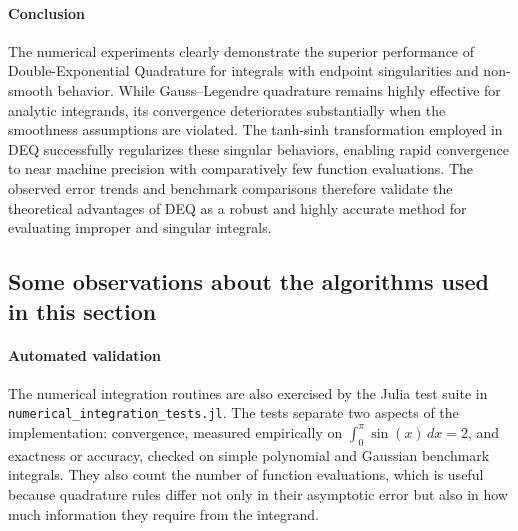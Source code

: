 \begin{solution}
	\paragraph{Conclusion}
	The numerical experiments clearly demonstrate the superior performance of
	Double-Exponential Quadrature for integrals with endpoint singularities and
	non-smooth behavior. While Gauss--Legendre quadrature remains highly effective
	for analytic integrands, its convergence deteriorates substantially when the
	smoothness assumptions are violated. The tanh-sinh transformation employed in
	DEQ successfully regularizes these singular behaviors, enabling rapid
	convergence to near machine precision with comparatively few function
	evaluations. The observed error trends and benchmark comparisons therefore
	validate the theoretical advantages of DEQ as a robust and highly accurate
	method for evaluating improper and singular integrals.

\end{solution}

\subsection{Some observations about the algorithms used in this section}

\paragraph{Automated validation}
The numerical integration routines are also exercised by the Julia test suite in
\texttt{numerical\_integration\_tests.jl}. The tests separate two
aspects of the implementation: convergence, measured empirically on
$\int_0^\pi \sin(x)\,dx=2$, and exactness or accuracy, checked on simple
polynomial and Gaussian benchmark integrals. They also count the number of
function evaluations, which is useful because quadrature rules differ not only in
their asymptotic error but also in how much information they require from the
integrand.

